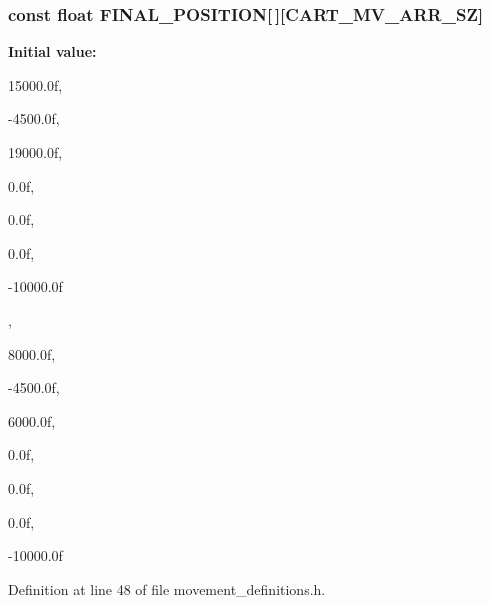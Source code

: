 \subsubsection[{\-F\-I\-N\-A\-L\-\_\-\-P\-O\-S\-I\-T\-I\-O\-N}]{\setlength{\rightskip}{0pt plus 5cm}const float {\bf \-F\-I\-N\-A\-L\-\_\-\-P\-O\-S\-I\-T\-I\-O\-N}[$\,$][{\bf \-C\-A\-R\-T\-\_\-\-M\-V\-\_\-\-A\-R\-R\-\_\-\-S\-Z}]}\label{movement__definitions_8h_a5fe0052a1578f9613671455a0e91a77b}
{\bfseries \-Initial value\-:}
\begin{DoxyCode}
 { { 15000.0f,
                                                                               
          -4500.0f,
                                                                               
          19000.0f,
                                                                               
              0.0f,
                                                                               
              0.0f,
                                                                               
              0.0f,
                                                                               
         -10000.0f },
                                                                               
        {  8000.0f,
                                                                               
          -4500.0f,
                                                                               
           6000.0f,
                                                                               
              0.0f,
                                                                               
              0.0f,
                                                                               
              0.0f,
                                                                               
         -10000.0f } }
\end{DoxyCode}


\-Definition at line 48 of file movement\-\_\-definitions.\-h.

